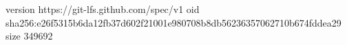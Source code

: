 version https://git-lfs.github.com/spec/v1
oid sha256:e26f5315b6da12fb37d602f21001e980708b8db56236357062710b674fddea29
size 349692
